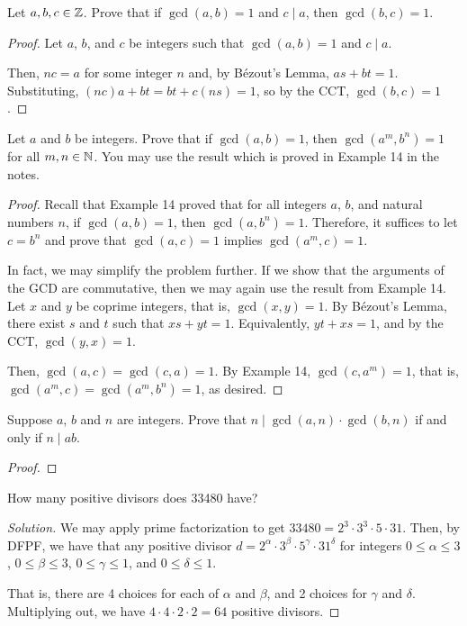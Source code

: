 \question Let $a,b,c\in\mathbb{Z}$. Prove that if $\gcd(a, b) = 1$ and $c \mid a$, then $\gcd(b, c) = 1$.
\begin{proof}
  Let $a$, $b$, and $c$ be integers such that $\gcd(a,b)=1$ and $c \mid a$.

  Then, $nc = a$ for some integer $n$ and, by Bézout's Lemma, $as+bt=1$.
  Substituting, $(nc)a+bt=bt+c(ns)=1$, so by the CCT, $\gcd(b,c)=1$.
\end{proof}


\question Let $a$ and $b$ be integers.
Prove that if $\gcd(a, b) = 1$, then $\gcd(a^m, b^n) = 1$ for all $m,n\in\mathbb{N}$.
You may use the result which is proved in Example 14 in the notes.
\begin{proof}
  Recall that Example 14 proved that for all integers $a$, $b$, and natural numbers $n$,
  if $\gcd(a, b)=1$, then $\gcd(a, b^n)=1$.
  Therefore, it suffices to let $c=b^n$ and prove that $\gcd(a, c)=1$ implies $\gcd(a^m, c)=1$.

  In fact, we may simplify the problem further.
  If we show that the arguments of the GCD are commutative,
  then we may again use the result from Example 14.
  Let $x$ and $y$ be coprime integers, that is, $\gcd(x,y)=1$.
  By Bézout's Lemma, there exist $s$ and $t$ such that $xs+yt=1$.
  Equivalently, $yt+xs=1$, and by the CCT, $\gcd(y,x)=1$.

  Then, $\gcd(a,c)=\gcd(c,a)=1$.
  By Example 14, $\gcd(c,a^m)=1$, that is, $\gcd(a^m,c)=\gcd(a^m,b^n)=1$, as desired.
\end{proof}


\question Suppose $a$, $b$ and $n$ are integers.
Prove that $n \mid \gcd(a, n) \cdot \gcd(b, n)$ if and only if $n \mid ab$.
\begin{proof}
\end{proof}


\question How many positive divisors does 33480 have?
\begin{proof}[Solution]
  We may apply prime factorization to get $33480=2^3\cdot3^3\cdot5\cdot31$.
  Then, by DFPF, we have that any positive divisor $d=2^\alpha\cdot3^\beta\cdot5^\gamma\cdot31^\delta$
  for integers $0\leq\alpha\leq3$, $0\leq\beta\leq3$, $0\leq\gamma\leq1$, and $0\leq\delta\leq1$.

  That is, there are 4 choices for each of $\alpha$ and $\beta$, and 2 choices for $\gamma$ and $\delta$.
  Multiplying out, we have $4\cdot4\cdot2\cdot2=64$ positive divisors.
\end{proof}



